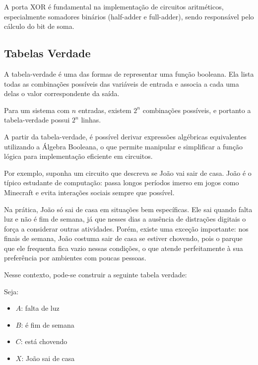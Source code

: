 \documentclass[a4paper,12pt]{article}
\begin{document}


A porta XOR é fundamental na implementação de circuitos aritméticos, especialmente somadores binários (half-adder e full-adder), sendo responsável pelo cálculo do bit de soma.
 
\subsection{Tabelas Verdade}

A tabela-verdade é uma das formas de representar uma função booleana. Ela lista todas as combinações possíveis das variáveis de entrada e associa a cada uma delas o valor correspondente da saída.

Para um sistema com $n$ entradas, existem $2^n$ combinações possíveis, e portanto a tabela-verdade possui $2^n$ linhas.

A partir da tabela-verdade, é possível derivar expressões algébricas equivalentes utilizando a Álgebra Booleana, o que permite manipular e simplificar a função lógica para implementação eficiente em circuitos.

Por exemplo, suponha um circuito que descreva se João vai sair de casa. João é o típico estudante de computação: passa longos períodos imerso em jogos como Minecraft e evita interações sociais sempre que possível.

Na prática, João só sai de casa em situações bem específicas. Ele sai quando falta luz e não é fim de semana, já que nesses dias a ausência de distrações digitais o força a considerar outras atividades. Porém, existe uma exceção importante: nos finais de semana, João costuma sair de casa se estiver chovendo, pois o parque que ele frequenta fica vazio nessas condições, o que atende perfeitamente à sua preferência por ambientes com poucas pessoas.

Nesse contexto, pode-se construir a seguinte tabela verdade:

Seja: \\
\begin{itemize}
    \item $A$: falta de luz
    \item $B$: é fim de semana
    \item $C$: está chovendo
    \item $X$: João sai de casa
\end{itemize}
\end{document}
